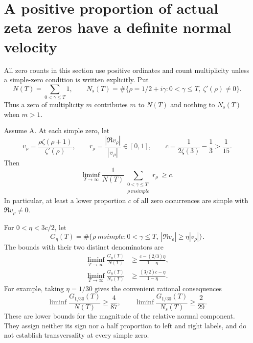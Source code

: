 \section{A positive proportion of actual zeta zeros have a definite normal velocity}
\label{sec:analytic-arithmetic-transverse-proportion}

All zero counts in this section use positive ordinates and
count multiplicity unless a simple-zero condition is written
explicitly. Put
\[
 N(T)=\sum_{0<\gamma\le T}1,\qquad
 N_s(T)=\#\{\rho=1/2+i\gamma:0<\gamma\le T,
                                      \ \zeta'(\rho)\ne0\}.
\]
Thus a zero of multiplicity $m$ contributes $m$ to $N(T)$ and
nothing to $N_s(T)$ when $m>1$.

\begin{theorem}
\label{thm:analytic-arithmetic-transverse-proportion}
Assume A. At each simple zero, let
\[
 v_\rho=\frac{\rho\zeta(\rho+1)}{\zeta'(\rho)},\qquad
 r_\rho=\frac{|\Re v_\rho|}{|v_\rho|}\in[0,1],\qquad
 c=\frac1{2\zeta(3)}-\frac13>\frac1{15}.
\]
Then
\begin{equation}\label{eq:analytic-normal-mean}
 \liminf_{T\to\infty}\frac1{N(T)}
                 \sum_{\substack{0<\gamma\le T\\\rho\ {
m simple}}}
                           r_\rho\ \ge c.
\end{equation}
In particular, at least a lower proportion $c$ of all zero
occurrences are simple with $\Re v_\rho\ne0$.

For $0<\eta<3c/2$, let
\[
 G_\eta(T)=\#\{\rho\ {
m simple}:0<\gamma\le T,
                              \ |\Re v_\rho|\ge\eta|v_\rho|\}.
\]
The bounds with their two distinct denominators are
\begin{align}
 \liminf_{T\to\infty}\frac{G_\eta(T)}{N(T)}
       &\ge\frac{c-(2/3)\eta}{1-\eta},
         \label{eq:analytic-total-transverse-density}\\
 \liminf_{T\to\infty}\frac{G_\eta(T)}{N_s(T)}
       &\ge\frac{(3/2)c-\eta}{1-\eta}.
         \label{eq:analytic-simple-transverse-density}
\end{align}
For example, taking $\eta=1/30$ gives the convenient rational
consequences
\[
 \liminf\frac{G_{1/30}(T)}{N(T)}\ge\frac4{87},\qquad
 \liminf\frac{G_{1/30}(T)}{N_s(T)}\ge\frac2{29}.
\]
These are lower bounds for the magnitude of the relative
normal component. They assign neither its sign nor a half
proportion to left and right labels, and do not establish
transversality at every simple zero.
\end{theorem}

